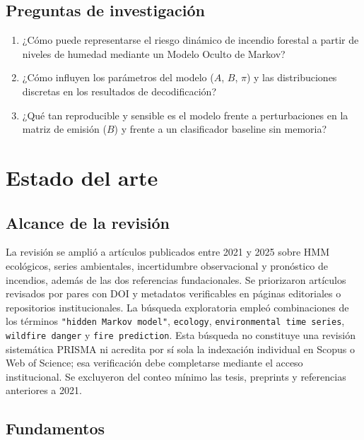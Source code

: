 \documentclass[11pt,letterpaper]{article}
\begin{document}
\subsection{Preguntas de investigación}

\begin{enumerate}[label=\textbf{P\arabic*.}]
  \item ¿Cómo puede representarse el riesgo dinámico de incendio forestal a partir de niveles de humedad mediante un Modelo Oculto de Markov?
  \item ¿Cómo influyen los parámetros del modelo (\(A\), \(B\), \(\pi\)) y las distribuciones discretas en los resultados de decodificación?
  \item ¿Qué tan reproducible y sensible es el modelo frente a perturbaciones en la matriz de emisión (\(B\)) y frente a un clasificador baseline sin memoria?
\end{enumerate}

\section{Estado del arte}

\subsection{Alcance de la revisión}

La revisión se amplió a artículos publicados entre 2021 y 2025 sobre HMM ecológicos, series ambientales, incertidumbre observacional y pronóstico de incendios, además de las dos referencias fundacionales. Se priorizaron artículos revisados por pares con DOI y metadatos verificables en páginas editoriales o repositorios institucionales. La búsqueda exploratoria empleó combinaciones de los términos \texttt{"hidden Markov model"}, \texttt{ecology}, \texttt{environmental time series}, \texttt{wildfire danger} y \texttt{fire prediction}. Esta búsqueda no constituye una revisión sistemática PRISMA ni acredita por sí sola la indexación individual en Scopus o Web of Science; esa verificación debe completarse mediante el acceso institucional. Se excluyeron del conteo mínimo las tesis, preprints y referencias anteriores a 2021.

\subsection{Fundamentos}
\end{document}
